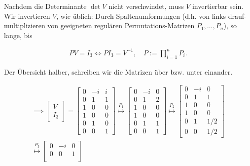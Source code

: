 \begin{solution}
Nachdem die Determinante $\det{V}$ nicht verschwindet, muss $V$ invertierbar sein.
Wir invertieren $V$, wie üblich:
Durch Spaltenumformungen (d.h. von links drauf-multiplizieren von geeigneten regulären Permutations-Matrizen $P_1, \ldots, P_n$), so lange, bis

\begin{align*}
    P V = I_3
    \iff
    P I_3 = V^{-1},
    \quad
    P := \prod_{i=1}^n P_i.
\end{align*}

Der Übersicht halber, schreiben wir die Matrizen über bzw. unter einander.

\begin{multline*}
    \implies
    \begin{bmatrix}
        V \\
        \hline
        I_3
    \end{bmatrix}
    =
    \begin{bmatrix}
        0 & -i & i \\
        0 &  1 & 1 \\
        1 &  0 & 0 \\
        \hline
        1 & 0 & 0 \\
        0 & 1 & 0 \\
        0 & 0 & 1
    \end{bmatrix}
    \stackrel{P_1}{\mapsto}
    \begin{bmatrix}
        0 & -i & 0 \\
        0 &  1 & 2 \\
        1 &  0 & 0 \\
        \hline
        1 & 0 & 0 \\
        0 & 1 & 1 \\
        0 & 0 & 1
    \end{bmatrix}
    \stackrel{P_2}{\mapsto}
    \begin{bmatrix}
        0 & -i & 0 \\
        0 &  1 & 1 \\
        1 &  0 & 0 \\
        \hline
        1 & 0 & 0 \\
        0 & 1 & 1/2 \\
        0 & 0 & 1/2
    \end{bmatrix} \\
    \stackrel{P_3}{\mapsto}
    \begin{bmatrix}
        0 & -i & 0 \\
        0 &  0 & 1 \\

\end{bmatrix}
\end{multline*}
\end{solution}
